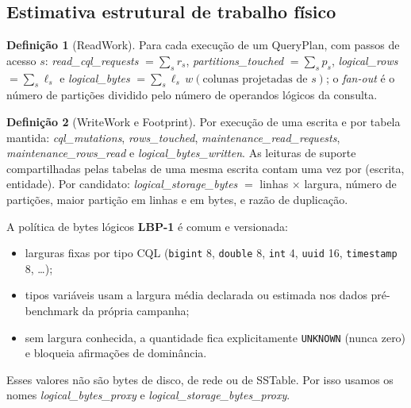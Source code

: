 \documentclass[10pt,a4paper,twoside]{article}
\theoremstyle{definition}\newtheorem{definicao}{Definição}
\begin{document}
\begin{center}\small
{}
\end{center}

\subsection{Estimativa estrutural de trabalho físico}
\begin{definicao}[ReadWork]
Para cada execução de um QueryPlan, com passos de acesso $s$:
\emph{read\_cql\_requests} $=\sum_s r_s$, \emph{partitions\_touched} $=\sum_s p_s$,
\emph{logical\_rows} $=\sum_s \ell_s$ e \emph{logical\_bytes} $=\sum_s \ell_s\, w(\text{colunas projetadas de }s)$;
o \emph{fan-out} é o número de partições dividido pelo número de operandos lógicos da consulta.
\end{definicao}
\begin{definicao}[WriteWork e Footprint]
Por execução de uma escrita e por tabela mantida: \emph{cql\_mutations}, \emph{rows\_touched},
\emph{maintenance\_read\_requests}, \emph{maintenance\_rows\_read} e \emph{logical\_bytes\_written}. As leituras de suporte
compartilhadas pelas tabelas de uma mesma escrita contam uma vez por (escrita, entidade). Por candidato:
\emph{logical\_storage\_bytes} $=$ linhas $\times$ largura, número de partições, maior partição em linhas e em bytes, e
razão de duplicação.
\end{definicao}

A política de bytes lógicos \textbf{LBP-1} é comum e versionada:
\begin{itemize}
\item larguras fixas por tipo CQL (\texttt{bigint} 8, \texttt{double} 8, \texttt{int} 4, \texttt{uuid} 16, \texttt{timestamp} 8, \ldots);
\item tipos variáveis usam a largura média declarada ou estimada nos dados pré-benchmark da própria campanha;
\item sem largura conhecida, a quantidade fica explicitamente \texttt{UNKNOWN} (nunca zero) e bloqueia afirmações de dominância.
\end{itemize}
Esses valores não são bytes de disco, de rede ou de SSTable. Por isso usamos os nomes \emph{logical\_bytes\_proxy} e
\emph{logical\_storage\_bytes\_proxy}.
\end{document}
